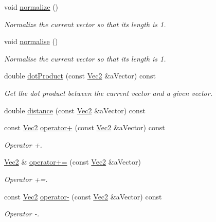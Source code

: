 \begin{DoxyCompactItemize}
void \hyperlink{class_math_1_1_vec2_a4e0949be704200adfd16677920df5c22}{normalize} ()
\begin{DoxyCompactList}\small\item\em Normalize the current vector so that its length is 1. \end{DoxyCompactList}\item 
void \hyperlink{class_math_1_1_vec2_abab039ed4ac43257829ea970f6c3b84a}{normalise} ()
\begin{DoxyCompactList}\small\item\em Normalise the current vector so that its length is 1. \end{DoxyCompactList}\item 
double \hyperlink{class_math_1_1_vec2_aa33630fea634ace9966b11f492e7fae8}{dotProduct} (const \hyperlink{class_math_1_1_vec2}{Vec2} \&aVector) const 
\begin{DoxyCompactList}\small\item\em Get the dot product between the current vector and a given vector. \end{DoxyCompactList}\item 
double \hyperlink{class_math_1_1_vec2_af8269f91dba4f7282d280bb29a0be4dc}{distance} (const \hyperlink{class_math_1_1_vec2}{Vec2} \&aVector) const 
\item 
const \hyperlink{class_math_1_1_vec2}{Vec2} \hyperlink{class_math_1_1_vec2_a9586cbbfbdc0f921d31e7e895965133b}{operator+} (const \hyperlink{class_math_1_1_vec2}{Vec2} \&aVector) const 
\begin{DoxyCompactList}\small\item\em Operator +. \end{DoxyCompactList}\item 
\hyperlink{class_math_1_1_vec2}{Vec2} \& \hyperlink{class_math_1_1_vec2_a7e053d6826734b2a17a11daf0da4fe30}{operator+=} (const \hyperlink{class_math_1_1_vec2}{Vec2} \&aVector)
\begin{DoxyCompactList}\small\item\em Operator +=. \end{DoxyCompactList}\item 
const \hyperlink{class_math_1_1_vec2}{Vec2} \hyperlink{class_math_1_1_vec2_a38c9a2f75e8ef0b0ee54707c4a438a0a}{operator-\/} (const \hyperlink{class_math_1_1_vec2}{Vec2} \&aVector) const 
\begin{DoxyCompactList}\small\item\em Operator -\/. \end{DoxyCompactList}\item 

\end{DoxyCompactItemize}
